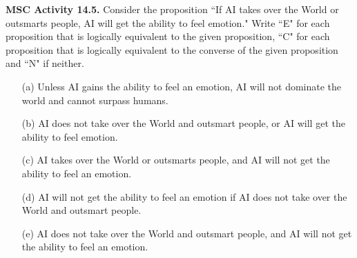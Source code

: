 \documentclass[aspectratio=169]{beamer}
\begin{document}
\begin{frame}[plain]{}

{\bf MSC Activity 14.5.}   
  Consider the proposition ``If AI takes over the World or outsmarts people, 
   AI will get the ability to feel emotion." 
   Write ``E" for each proposition that is logically equivalent to the given proposition,
   ``C" for each proposition that is
    logically equivalent to the converse of the given proposition and
 ``N" if neither.
 \begin{itemize} 
   \item[(a)] Unless AI gains the ability to feel an emotion, 
     AI will not dominate the world and cannot surpass humans.
   
   
   \item[(b)] AI does not take over the World and outsmart people, or 
        AI will get the ability to feel emotion.
   
   
   \item[(c)] AI takes over the World or outsmarts people, and 
     AI will not get the ability to feel an emotion.
   
   
   \item[(d)]  AI will not get the ability to feel an emotion 
     if AI does not take over the World and outsmart people.
 
   
   \item[(e)] AI does not take over the World and outsmart people, and 
        AI will not get the ability to feel an emotion.
\end{itemize}
 
\end{frame}
 
   
\end{document}
